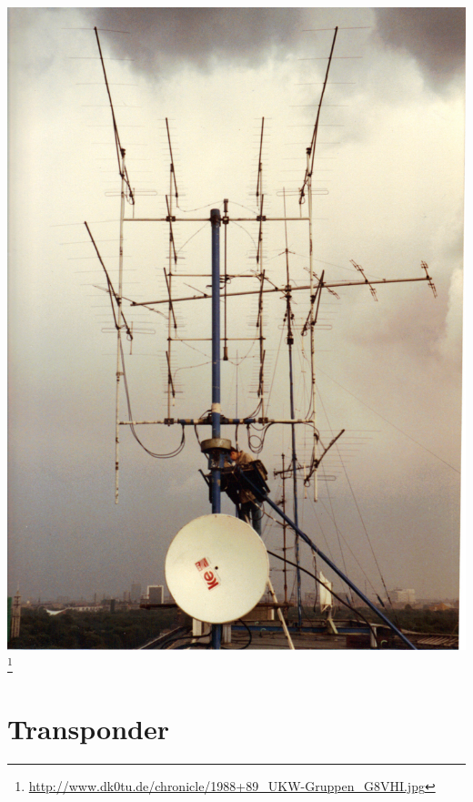 \begin{frame}

    \begin{center}
        \includegraphics[width=1\textwidth,height=.9\textheight,keepaspectratio]{bv11/1988+89_UKW-Gruppen_G8VHI.jpg}
        \footnote{\tiny \url{http://www.dk0tu.de/chronicle/1988+89_UKW-Gruppen_G8VHI.jpg}}
    \end{center}

\end{frame}

\section{Transponder}

